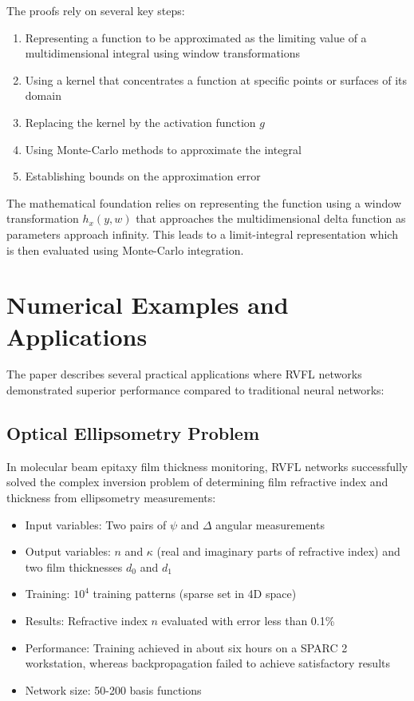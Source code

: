 \documentclass[11pt]{article}
\begin{document}
The proofs rely on several key steps:

\begin{enumerate}
    \item Representing a function to be approximated as the limiting value of a multidimensional integral using window transformations
    \item Using a kernel that concentrates a function at specific points or surfaces of its domain
    \item Replacing the kernel by the activation function $g$
    \item Using Monte-Carlo methods to approximate the integral
    \item Establishing bounds on the approximation error
\end{enumerate}

The mathematical foundation relies on representing the function using a window transformation $h_x(y,w)$ that approaches the multidimensional delta function as parameters approach infinity. This leads to a limit-integral representation which is then evaluated using Monte-Carlo integration.

\section{Numerical Examples and Applications}

The paper describes several practical applications where RVFL networks demonstrated superior performance compared to traditional neural networks:

\subsection{Optical Ellipsometry Problem}

In molecular beam epitaxy film thickness monitoring, RVFL networks successfully solved the complex inversion problem of determining film refractive index and thickness from ellipsometry measurements:

\begin{itemize}
    \item Input variables: Two pairs of $\psi$ and $\Delta$ angular measurements
    \item Output variables: $n$ and $\kappa$ (real and imaginary parts of refractive index) and two film thicknesses $d_0$ and $d_1$
    \item Training: $10^4$ training patterns (sparse set in 4D space)
    \item Results: Refractive index $n$ evaluated with error less than 0.1\%
    \item Performance: Training achieved in about six hours on a SPARC 2 workstation, whereas backpropagation failed to achieve satisfactory results
    \item Network size: 50-200 basis functions
\end{itemize}
\end{document}
